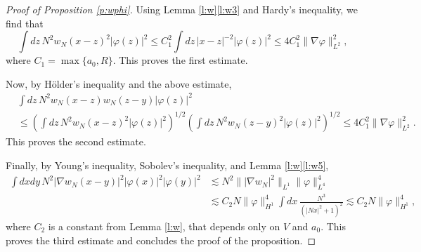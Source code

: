 \documentclass[11pt,a4paper,draft,DIV11]{scrartcl}	%
\newcommand{\bd}{\begin{displaymath}}			%
\newcommand{\ed}{\end{displaymath}}
\begin{document}
\begin{proof}[Proof of Proposition \ref{p:wphi}]
  Using Lemma \ref{l:w}\ref{l:w3} and Hardy's inequality, we find that
  \bd
    \int dz \, N^2 w_N(x-z)^2 |\varphi(z)|^2  \le C_1^2 \int dz \,
    |x-z|^{-2} |\varphi(z)|^2 \leq 4 C_1^2 \| \nabla \varphi \|_{L^2}^2,
  \ed
  where $C_1 = \max\{a_0, R\}$. This proves
  the first estimate.


  Now, by H\"older's inequality and the above estimate,
  \begin{align*}
    & \int dz \, N^2 w_N(x-z) w_N(z-y) |\varphi(z)|^2 \\
    & \le \left( \int dz \, N^2 w_N(x-z)^2 |\varphi(z)|^2 \right)^{1/2} \left(
    \int dz \, N^2 w_N(z-y)^2 |\varphi(z)|^2 \right)^{1/2} \le 4C_1^2 \|
    \nabla \varphi \|_{L^2}^2.
  \end{align*}
  This proves the second estimate.


  Finally, by Young's inequality, Sobolev's inequality, and Lemma
  \ref{l:w}\ref{l:w5},
  \begin{align*}
    \int dx dy \, N^2 |\nabla w_N(x-y)|^2 |\varphi(x)|^2 |\varphi(y)|^2 & \apprle
    N^2 \| | \nabla w_N|^2 \|_{L^1} \| \varphi \|_{L^4}^4 \\
    & \apprle C_2 N \| \varphi \|_{H^1}^4 \int dx \, \frac{N^3}{(|Nx|^2 +
    1)^2} \apprle C_2 N \| \varphi \|_{H^1}^4,
  \end{align*}
  where $C_2$ is a constant from Lemma \ref{l:w}, that depends only on $V$ and
  $a_0$. This proves the third estimate and concludes the proof of the
  proposition.
\end{proof}
\end{document}
